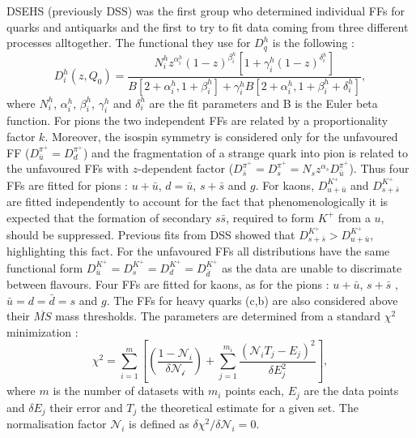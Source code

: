 DSEHS (previously DSS) was the first group who determined individual FFs for quarks and antiquarks and the first to try to fit data coming from three different processes alltogether.
The functional they use for $D^h_q$ is the following :
%
\begin{equation}
  D^h_i (z,Q_0) = \frac{N^h_i z^{\alpha^h_i}(1-z)^{\beta^h_i}\left[ 1+\gamma^h_i(1-z)^{\delta^h_i}\right]}{B\left[2+\alpha^h_i,1+\beta^h_i\right]+\gamma^h_i B\left[2+\alpha^h_i,1+\beta^h_i+\delta^h_i\right]},
  \label{eq:DSEHSparam}
\end{equation}
%
where $N^h_i$, $\alpha^h_i$, $\beta^h_i$, $\gamma^h_i$ and $\delta^h_i$  are the fit parameters and B is the Euler beta function. For pions the two independent FFs are related by a proportionality factor $k$. Moreover, the isospin symmetry is considered only for the unfavoured FF ($D^{\pi^{+}}_{\bar{u}} = D^{\pi^{+}}_{d}$) and the fragmentation of a strange quark into pion is related to the unfavoured FFs with $z$-dependent factor ($D^{\pi^{+}}_{\bar{s}} = D^{\pi^{+}}_{s}=N_s z^{\alpha_s} D^{\pi^{+}}_{\bar{u}}$). Thus four FFs are fitted for pions : $u+\bar{u}$, $d=\bar{u}$, $s+\bar{s}$ and $g$. For kaons, $D^{K^+}_{u+\bar{u}}$ and $D^{K^+}_{s+\bar{s}}$ are fitted independently to account for the fact that phenomenologically it is expected that the formation of secondary $s\bar{s}$, required to form $K^+$ from a $u$, should be suppressed. Previous fits from DSS showed that $D^{K^+}_{s+\bar{s}} > D^{K^+}_{u+\bar{u}}$, highlighting this fact. For the unfavoured FFs all distributions have the same functional form  $D^{K^+}_{\bar{u}} = D^{K^+}_{s} = D^{K^+}_{d} = D^{K^+}_{\bar{d}}$ as the data are unable to discrimate between flavours. Four FFs are fitted for kaons, as for the pions :  $u+\bar{u}$, $s+\bar{s}$ , $\bar{u}=d=\bar{d}=s$ and $g$.
The FFs for heavy quarks (c,b) are also considered above their $\overline{MS}$ mass thresholds.
The parameters are determined from a standard $\chi^2$ minimization :
%
\begin{equation}
  \chi^2 =  \sum_{i=1}^{m} \left[ \left( \frac{1-\mathscr{N}_i}{\delta\mathscr{N_i}} \right) + \sum_{j=1}^{m_i} \frac{(\mathscr{N}_i T_j - E_j)^2}{\delta E^2_j} \right],
  \label{eq:DSEHSmin}
\end{equation}
%
where $m$ is the number of datasets with $m_i$ points each, $E_j$ are the data points and $\delta E_j$ their error and $T_j$ the theoretical estimate for a given set. The normalisation factor $\mathscr{N}_i$ is defined as $\delta \chi^2 / \delta\mathscr{N}_i = 0$.

